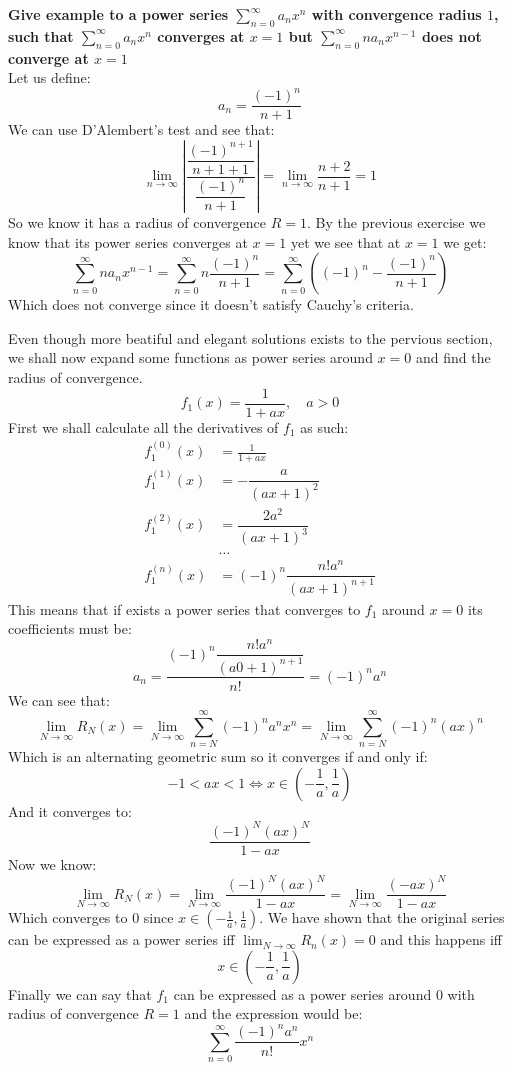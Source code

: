 \documentclass{article}
\theoremstyle{plain}
\begin{document}
	\newpage
	
	\textbf{Give example to a power series $\sum_{n=0}^{\infty}{a_n x^n}$ 
	with convergence radius $1$, such that $\sum_{n=0}^{\infty}{a_n x^n}$ 
	converges at $x=1$ but $\sum_{n=0}^{\infty}{n a_n x^{n-1}}$ does not 
	converge at $x=1$} \\
	Let us define:
	\[
		a_n = \frac{(-1)^n}{n+1}
	\]
	We can use D'Alembert's test and see that:
	\[
		\lim_{n\to\infty}
		{
			\left\vert
			\dfrac{\dfrac{(-1)^{n+1}}{n+1+1}}{\dfrac{(-1)^n}{n+1}}
			\right\vert
		} = 
		\lim_{n\to\infty}
		{
			\dfrac{n+2}{n+1}
		} = 1
	\]
	So we know it has a radius of convergence $R = 1$. By the previous
	exercise we know that its power series converges at $x = 1$ yet we see 
	that at $x=1$ we get:
	\[
		\sum_{n=0}^{\infty}{n a_n x^{n-1}} = 
		\sum_{n=0}^{\infty}{n \frac{(-1)^n}{n+1}} = 
		\sum_{n=0}^{\infty}{\left((-1)^n - \frac{(-1)^n}{n+1}\right)}
	\]
	Which does not converge since it doesn't satisfy Cauchy's criteria.
	
	\newpage
	
	Even though more beatiful and elegant solutions exists to the pervious
	section, we shall now expand some functions as power series around $x=0$
	and find the radius of convergence.
	\[
		f_1(x) = \frac{1}{1+ax},\quad a > 0
	\]
	First we shall calculate all the derivatives of $f_1$ as such:
	\begin{align*}
		f^{(0)}_1(x) &= \frac{1}{1+ax} \\
		f^{(1)}_1(x) &= -\dfrac{a}{\left(ax+1\right)^2} \\
		f^{(2)}_1(x) &= \dfrac{2a^2}{\left(ax+1\right)^3} \\
		&\dots \\
		f^{(n)}_1(x) &= (-1)^n \dfrac{n! a^{n}}{\left(ax+1\right)^{n+1}}
	\end{align*}
	This means that if exists a power series that converges to $f_1$ around
	$x = 0$ its coefficients must be:
	\[
		a_n = 
		\frac{(-1)^n \dfrac{n! a^{n}}{\left(a0+1\right)^{n+1}}}{n!} = 
		(-1)^n a^n
	\]
	We can see that:
	\[
		\lim_{N\to\infty}{R_N(x)} = 
		\lim_{N\to\infty}
		{\sum_{n=N}^{\infty}{(-1)^n a^n x^n}} = 
		\lim_{N\to\infty}
		{\sum_{n=N}^{\infty}{(-1)^n (ax)^n}}
	\]
	Which is an alternating geometric sum so it converges if and only if:
	\[
		-1 < ax < 1 \iff x\in \left(-\frac{1}{a},\frac{1}{a}\right)
	\]
	And it converges to:
	\[
		\frac{(-1)^N (ax)^N}{1-ax}
	\]
	Now we know:
	\[
		\lim_{N\to\infty}{R_N(x)} = 
		\lim_{N\to\infty}{\frac{(-1)^N (ax)^N}{1-ax}} = 
		\lim_{N\to\infty}{\frac{(-ax)^N}{1-ax}}
	\]
	Which converges to $0$ since $x\in \left(-\frac{1}{a},\frac{1}{a}\right)$.
	We have shown that the original series can be expressed as a power
	series iff $\lim_{N\to\infty}{R_n(x)} = 0$ and this happens iff
	\[
		x\in\left(-\frac{1}{a}, \frac{1}{a}\right)
	\]
	Finally we can say that $f_1$ can be expressed as a power series around 
	$0$ with radius of convergence $R = 1$ and the expression would be:
	\[
		\sum_{n=0}^{\infty}{\frac{(-1)^n a^n}{n!}x^n}
	\]
	
\end{document}

